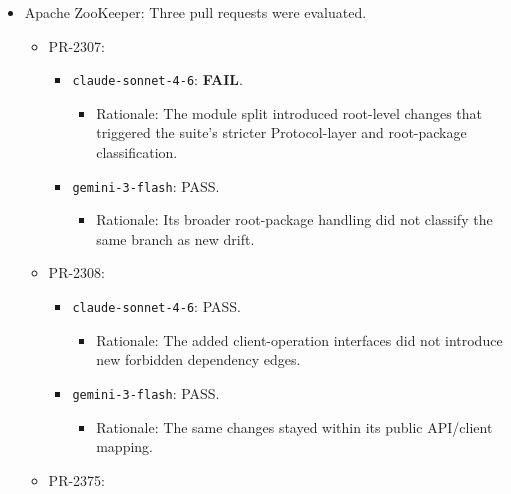 \documentclass[sigconf,screen]{acmart}
\begin{document}
\begin{itemize}
\begin{itemize}
\begin{itemize}
            \item \texttt{gemini-3-flash}: PASS.
            \begin{itemize}
                \item Rationale: The third-party codec did not create a new Spring-internal layer violation.
            \end{itemize}
        \end{itemize}
    \end{itemize}
    \item Apache ZooKeeper: Three pull requests were evaluated.
    \begin{itemize}
        \item PR-2307:
        \begin{itemize}
            \item \texttt{claude-sonnet-4-6}: \textbf{FAIL}.
            \begin{itemize}
                \item Rationale: The module split introduced root-level changes that triggered the suite's stricter Protocol-layer and root-package classification.
            \end{itemize}
            \item \texttt{gemini-3-flash}: PASS.
            \begin{itemize}
                \item Rationale: Its broader root-package handling did not classify the same branch as new drift.
            \end{itemize}
        \end{itemize}
        \item PR-2308:
        \begin{itemize}
            \item \texttt{claude-sonnet-4-6}: PASS.
            \begin{itemize}
                \item Rationale: The added client-operation interfaces did not introduce new forbidden dependency edges.
            \end{itemize}
            \item \texttt{gemini-3-flash}: PASS.
            \begin{itemize}
                \item Rationale: The same changes stayed within its public API/client mapping.
            \end{itemize}
        \end{itemize}
        \item PR-2375:

\end{itemize}
\end{itemize}
\end{document}
